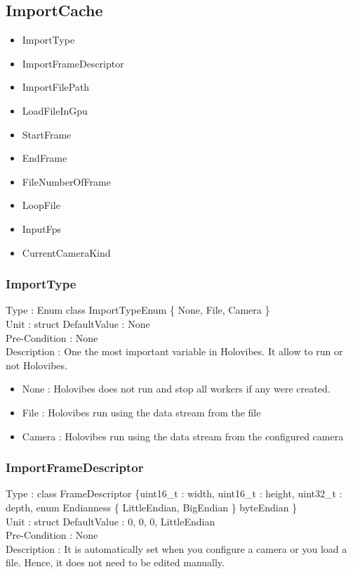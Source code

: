 
\subsection{ImportCache}
\begin{itemize}
    \item ImportType
    \item ImportFrameDescriptor
    \item ImportFilePath
    \item LoadFileInGpu
    \item StartFrame
    \item EndFrame
    \item FileNumberOfFrame
    \item LoopFile
    \item InputFps
    \item CurrentCameraKind
\end{itemize}

\subsubsection{ImportType}
\noindent
Type : Enum class ImportTypeEnum \{ None, File, Camera \}\\
Unit : struct
DefaultValue : None\\
Pre-Condition : None\\
Description : One the most important variable in Holovibes. It allow to run or not Holovibes.\\
\begin{itemize}
    \item None : Holovibes does not run and stop all workers if any were created. 
    \item File : Holovibes run using the data stream from the file 
    \item Camera : Holovibes run using the data stream from the configured camera 
\end{itemize}

\subsubsection{ImportFrameDescriptor}
\noindent
Type : class FrameDescriptor \{uint16\_t : width, uint16\_t : height, uint32\_t : depth, enum Endianness \{ LittleEndian, BigEndian \} byteEndian \} \\
Unit : struct
DefaultValue : { 0, 0, 0, LittleEndian }\\
Pre-Condition : None\\
Description : It is automatically set when you configure a camera or you load a file. Hence, it does not need to be edited manually.

